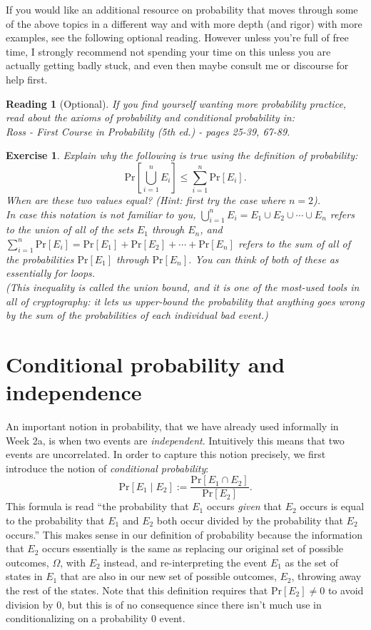 \documentclass[12pt]{article}
\newcommand{\pr}[1]{\text{Pr}\left[#1\right]}
\newtheorem{exercise}{Exercise}
\newtheorem{reading}{Reading}
\theoremstyle{definition}
\theoremstyle{remark}
\theoremstyle{definition}
\begin{document}
If you would like an additional resource on probability that moves through some of the above topics in a different way and with more depth (and rigor) with more examples, see the following optional reading. However unless you're full of free time, I strongly recommend not spending your time on this unless you are actually getting badly stuck, and even then maybe consult me or discourse for help first.

\begin{reading}[Optional]
If you find yourself wanting more probability practice, read about the axioms of probability and conditional probability in:\\
Ross - First Course in Probability (5th ed.) - pages 25-39, 67-89.
\end{reading}

\begin{exercise}
Explain why the following is true using the definition of probability: $$\pr{\bigcup_{i=1}^n E_i}\leq \sum_{i=1}^n\pr{E_i}.$$ When are these two values equal? (Hint: first try the case where $n=2$).\\

In case this notation is not familiar to you, $\bigcup_{i=1}^n E_i = E_1\cup E_2\cup\cdots\cup E_n$ refers to the union of all of the sets $E_1$ through $E_n$, and $\sum_{i=1}^n\pr{E_i} = \pr{E_1} + \pr{E_2} + \cdots + \pr{E_n}$ refers to the sum of all of the probabilities $\pr{E_1}$ through $\pr{E_n}$. You can think of both of these as essentially for loops.\\
(This inequality is called the \emph{union bound}, and it is one of the most-used tools in all of cryptography: it lets us upper-bound the probability that \emph{anything} goes wrong by the sum of the probabilities of each individual bad event.)
\end{exercise}

\section*{Conditional probability and independence}

An important notion in probability, that we have already used informally in Week 2a, is when two events are \emph{independent}. Intuitively this means that two events are uncorrelated. In order to capture this notion precisely, we first introduce the notion of \emph{conditional probability}: $$\pr{E_1\mid E_2} := \frac{\pr{E_1\cap E_2}}{\pr{E_2}}.$$ This formula is read ``the probability that $E_1$ occurs \emph{given} that $E_2$ occurs is equal to the probability that $E_1$ and $E_2$ both occur divided by the probability that $E_2$ occurs.'' This makes sense in our definition of probability because the information that $E_2$ occurs essentially is the same as replacing our original set of possible outcomes, $\Omega$, with $E_2$ instead, and re-interpreting the event $E_1$ as the set of states in $E_1$ that are also in our new set of possible outcomes, $E_2$, throwing away the rest of the states. Note that this definition requires that $\pr{E_2}\neq 0$ to avoid division by $0$, but this is of no consequence since there isn't much use in conditionalizing on a probability $0$ event.\\
\end{document}
